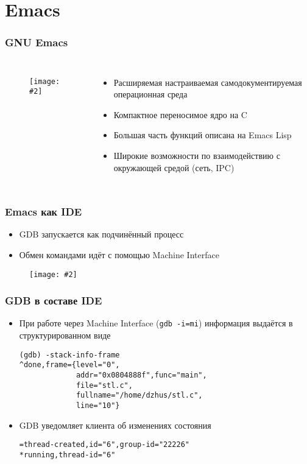 \documentclass[onlymath]{beamer}
\newcommand\code\texttt
\newcommand{\cenfig}[2]{\begin{figure}\centering\texttt{[image: \#2]}
  \end{figure}}
\begin{document}
\section{Emacs}
\begin{frame}
  \frametitle{GNU Emacs}
  \begin{columns}
    \cenfig{0.2}{emacs.png}
  \begin{itemize}
  \item Расширяемая настраиваемая самодокументируемая операционная
    среда
  \item Компактное переносимое ядро на C
  \item Большая часть функций описана на Emacs Lisp
  \item Широкие возможности по взаимодействию с окружающей средой
    (сеть, IPC)
  \end{itemize}
\end{columns}
\end{frame}

\begin{frame}
  \frametitle{Emacs как IDE}
  \begin{itemize}
  \item GDB запускается как подчинённый процесс
  \item Обмен командами идёт с помощью Machine Interface
  \end{itemize}
  \cenfig{0.2}{emacs-gdb.png}
\end{frame}

\begin{frame}[fragile]
  \frametitle{GDB в составе IDE}
  \begin{itemize}
  \item При работе через Machine Interface (\code{gdb -i=mi})
    информация выдаётся в структурированном виде
\begin{lstlisting}[style=session]
(gdb) -stack-info-frame
^done,frame={level="0",
             addr="0x0804888f",func="main",
             file="stl.c",
             fullname="/home/dzhus/stl.c",
             line="10"}
\end{lstlisting}
  \item GDB уведомляет клиента об изменениях состояния
\begin{lstlisting}[style=session]
=thread-created,id="6",group-id="22226"
*running,thread-id="6"
\end{lstlisting}
  \end{itemize}
\end{frame}
\end{document}

